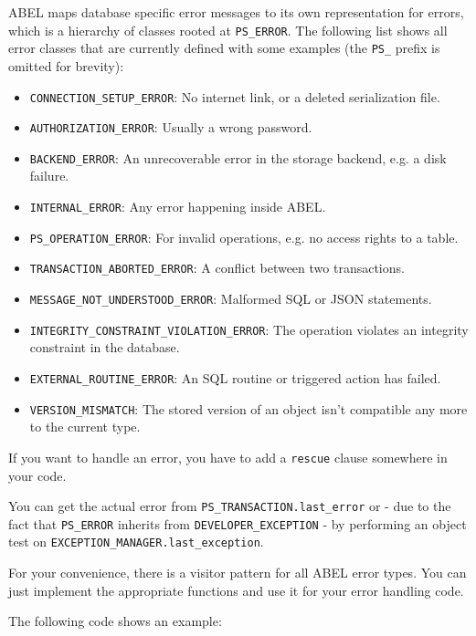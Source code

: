 \documentclass[a4paper,12pt]{report}
\begin{document}
ABEL maps database specific error messages to its own representation for errors, which is a hierarchy of classes rooted at \lstinline!PS_ERROR!.
The following list shows all error classes that are currently defined with some examples (the \lstinline!PS_! prefix is omitted for brevity):

\begin{itemize}
\item \lstinline!CONNECTION_SETUP_ERROR!: No internet link, or a deleted serialization file.
\item \lstinline!AUTHORIZATION_ERROR!: Usually a wrong password.
\item \lstinline!BACKEND_ERROR!: An unrecoverable error in the storage backend, e.g. a disk failure.
\item \lstinline!INTERNAL_ERROR!: Any error happening inside ABEL.
\item \lstinline!PS_OPERATION_ERROR!: For invalid operations, e.g. no access rights to a table.
\item \lstinline!TRANSACTION_ABORTED_ERROR!: A conflict between two transactions.
\item \lstinline!MESSAGE_NOT_UNDERSTOOD_ERROR!: Malformed SQL or JSON statements.
\item \lstinline!INTEGRITY_CONSTRAINT_VIOLATION_ERROR!: The operation violates an integrity constraint in the database.
\item \lstinline!EXTERNAL_ROUTINE_ERROR!: An SQL routine or triggered action has failed.
\item \lstinline!VERSION_MISMATCH!: The stored version of an object isn't compatible any more to the current type.
\end{itemize}

If you want to handle an error, you have to add a \lstinline{rescue} clause somewhere in your code.

You can get the actual error from \lstinline!PS_TRANSACTION.last_error! or - due to the fact that \lstinline!PS_ERROR! inherits from \lstinline!DEVELOPER_EXCEPTION! -
by performing an object test on \lstinline!EXCEPTION_MANAGER.last_exception!.

For your convenience, there is a visitor pattern for all ABEL error types. 
You can just implement the appropriate functions and use it for your error handling code.

The following code shows an example:
\end{document}
